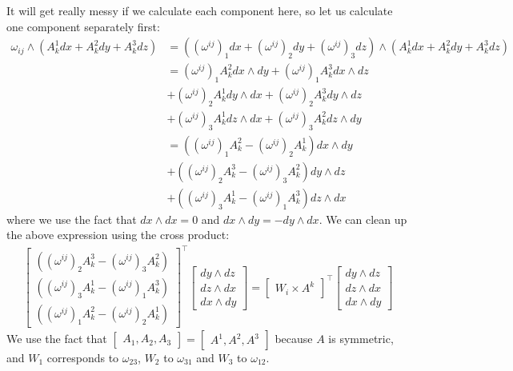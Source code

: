 \documentclass[a4paper,twoside,openright,11pt]{report}
\begin{document}
It will get really messy if we calculate each component here, so let us calculate one component separately first:
\begin{align*}
  \omega_{ij} \wedge (A^1_kdx + A^2_kdy + A^3_kdz) &=
  ((\omega^{ij})_1dx + (\omega^{ij})_2dy + (\omega^{ij})_3dz) \wedge (A^1_kdx + A^2_kdy+A^3_kdz) \\
  &= (\omega^{ij})_1 A^2_k dx\wedge dy + (\omega^{ij})_1 A^3_k dx \wedge dz \\
  &+ (\omega^{ij})_2 A^1_k dy\wedge dx + (\omega^{ij})_2 A^3_k dy \wedge dz \\
  &+ (\omega^{ij})_3 A^1_k dz\wedge dx + (\omega^{ij})_3 A^2_k dz \wedge dy \\
  &= ((\omega^{ij})_1A^2_k - (\omega^{ij})_2A^1_k)dx \wedge dy \\
  &+ ((\omega^{ij})_2A^3_k - (\omega^{ij})_3A^2_k)dy \wedge dz \\
  &+ ((\omega^{ij})_3A^1_k - (\omega^{ij})_1A^3_k)dz \wedge dx
\end{align*}
where we use the fact that $dx \wedge dx = 0$ and $dx \wedge dy = -dy \wedge dx$.
We can clean up the above expression using the cross product:
\begin{align*}
  \begin{bmatrix}
    ((\omega^{ij})_2A^3_k - (\omega^{ij})_3A^2_k) \\
    ((\omega^{ij})_3A^1_k - (\omega^{ij})_1A^3_k) \\
    ((\omega^{ij})_1A^2_k - (\omega^{ij})_2A^1_k) 
  \end{bmatrix}^{\top}
  \begin{bmatrix}
    dy \wedge dz \\
    dz \wedge dx \\
    dx \wedge dy 
  \end{bmatrix} = 
  \begin{bmatrix}
    W_i \times A^k
  \end{bmatrix}^{\top}
  \begin{bmatrix}
    dy \wedge dz \\
    dz \wedge dx \\
    dx \wedge dy 
  \end{bmatrix}
\end{align*}
We use the fact that $\begin{bmatrix}
  A_1, A_2, A_3 
\end{bmatrix} = \begin{bmatrix}
  A^1, A^2, A^3
\end{bmatrix}$ because $A$ is symmetric, and $W_1$ corresponds to $\omega_{23}$, $W_2$ to $\omega_{31}$ and $W_3$ to $\omega_{12}$.
\end{document}
